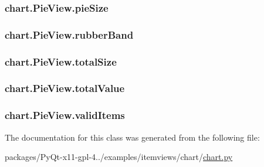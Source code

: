 \subsubsection[{pie\+Size}]{\setlength{\rightskip}{0pt plus 5cm}chart.\+Pie\+View.\+pie\+Size}\label{classchart_1_1PieView_a864ba262f5be42df001c0bc65b4b6ce2}
\hypertarget{classchart_1_1PieView_a4b2ac7ee894044fc7cc05506843fbb47}{}
\subsubsection[{rubber\+Band}]{\setlength{\rightskip}{0pt plus 5cm}chart.\+Pie\+View.\+rubber\+Band}\label{classchart_1_1PieView_a4b2ac7ee894044fc7cc05506843fbb47}
\hypertarget{classchart_1_1PieView_a765830427e3d9f955c36230155c4eda5}{}
\subsubsection[{total\+Size}]{\setlength{\rightskip}{0pt plus 5cm}chart.\+Pie\+View.\+total\+Size}\label{classchart_1_1PieView_a765830427e3d9f955c36230155c4eda5}
\hypertarget{classchart_1_1PieView_acc21a9392e901e12b3ac9a517427f620}{}
\subsubsection[{total\+Value}]{\setlength{\rightskip}{0pt plus 5cm}chart.\+Pie\+View.\+total\+Value}\label{classchart_1_1PieView_acc21a9392e901e12b3ac9a517427f620}
\hypertarget{classchart_1_1PieView_a029961f11f9deb755fb75fef1d6d3179}{}
\subsubsection[{valid\+Items}]{\setlength{\rightskip}{0pt plus 5cm}chart.\+Pie\+View.\+valid\+Items}\label{classchart_1_1PieView_a029961f11f9deb755fb75fef1d6d3179}


The documentation for this class was generated from the following file\+:\begin{DoxyCompactItemize}
\item 
packages/\+Py\+Qt-\/x11-\/gpl-\/4../examples/itemviews/chart/\hyperlink{chart_8py}{chart.\+py}\end{DoxyCompactItemize}
